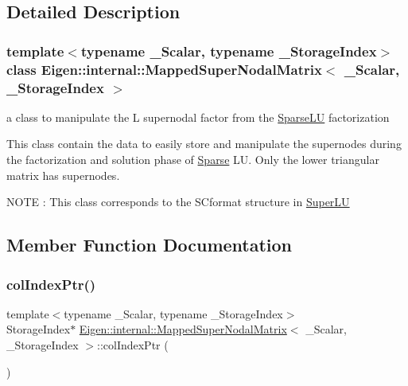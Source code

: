 \subsection{Detailed Description}
\subsubsection*{template$<$typename \+\_\+\+Scalar, typename \+\_\+\+Storage\+Index$>$\newline
class Eigen\+::internal\+::\+Mapped\+Super\+Nodal\+Matrix$<$ \+\_\+\+Scalar, \+\_\+\+Storage\+Index $>$}

a class to manipulate the L supernodal factor from the \mbox{\hyperlink{class_eigen_1_1_sparse_l_u}{Sparse\+LU}} factorization 

This class contain the data to easily store and manipulate the supernodes during the factorization and solution phase of \mbox{\hyperlink{struct_eigen_1_1_sparse}{Sparse}} LU. Only the lower triangular matrix has supernodes.

N\+O\+TE \+: This class corresponds to the S\+Cformat structure in \mbox{\hyperlink{class_eigen_1_1_super_l_u}{Super\+LU}} 

\subsection{Member Function Documentation}
\mbox{\label{class_eigen_1_1internal_1_1_mapped_super_nodal_matrix_a87c0272aedd8ee01d4245bd719738b5d}} 
\subsubsection{\texorpdfstring{colIndexPtr()}{colIndexPtr()}}
{\footnotesize\ttfamily template$<$typename \+\_\+\+Scalar, typename \+\_\+\+Storage\+Index$>$ \\
Storage\+Index$\ast$ \mbox{\hyperlink{class_eigen_1_1internal_1_1_mapped_super_nodal_matrix}{Eigen\+::internal\+::\+Mapped\+Super\+Nodal\+Matrix}}$<$ \+\_\+\+Scalar, \+\_\+\+Storage\+Index $>$\+::col\+Index\+Ptr (\begin{DoxyParamCaption}{ }\end{DoxyParamCaption})\hspace{0.3cm}{\ttfamily [inline]}}

